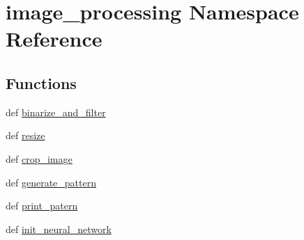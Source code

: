 \hypertarget{namespaceimage__processing}{\section{image\-\_\-processing Namespace Reference}
\label{namespaceimage__processing}
}
\subsection*{Functions}
\begin{DoxyCompactItemize}
\item 
def \hyperlink{namespaceimage__processing_af69c73451ea79177d7a6cdd4a6f4c6cd}{binarize\-\_\-and\-\_\-filter}
\item 
def \hyperlink{namespaceimage__processing_a86f61f82f2e9ab40fedca1122ed22bdf}{resize}
\item 
def \hyperlink{namespaceimage__processing_a949b0192d334a4251ed980527886c259}{crop\-\_\-image}
\item 
def \hyperlink{namespaceimage__processing_a39c4cc9ac706a7aa51faadb910c14f9a}{generate\-\_\-pattern}
\item 
def \hyperlink{namespaceimage__processing_a8fe5658053414146d9a4a36dd4a67f5d}{print\-\_\-patern}
\item 
def \hyperlink{namespaceimage__processing_a532c05461b7927b7dbf9fca472f4b076}{init\-\_\-neural\-\_\-network}
\end{DoxyCompactItemize}
